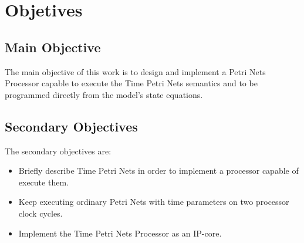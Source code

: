 \section{Objetives}

	\subsection{Main Objective} 
	The main objective of this work is to design and implement a Petri Nets Processor capable to 
	execute the Time Petri Nets semantics and to be programmed directly from the model's state 
	equations.
	
	\subsection{Secondary Objectives}
	The secondary objectives are:
	\begin{itemize}
        \item Briefly describe Time Petri Nets in order to implement a processor capable of execute them.
        \item Keep executing ordinary Petri Nets with time parameters on two processor clock cycles.
        \item Implement the Time Petri Nets Processor as an IP-core.
	\end{itemize}
	